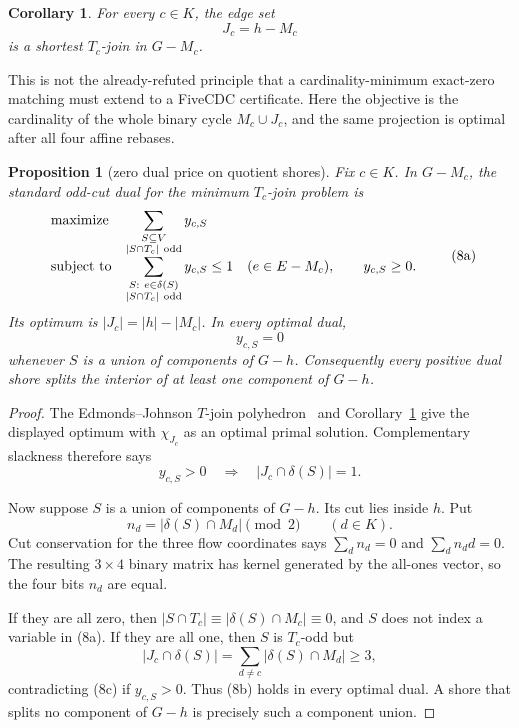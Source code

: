 \documentclass[11pt]{article}
\newtheorem{proposition}[theorem]{Proposition}
\newtheorem{corollary}[theorem]{Corollary}
\theoremstyle{definition}
\theoremstyle{remark}
\begin{document}
\begin{corollary}\label{cor:tjoin}
For every \(c\in K\), the edge set
\[
                              J_c=h-M_c
\]
is a shortest \(T_c\)-join in \(G-M_c\).
\end{corollary}

This is not the already-refuted principle that a cardinality-minimum
exact-zero matching must extend to a FiveCDC certificate.  Here the
objective is the cardinality of the whole binary cycle
\(M_c\cup J_c\), and the same projection is optimal after all four affine
rebases.

\begin{proposition}[zero dual price on quotient shores]
\label{prop:zerodualprice}
Fix \(c\in K\).  In \(G-M_c\), the standard odd-cut dual for the minimum
\(T_c\)-join problem is
\[
\begin{array}{ll}
\text{maximize}&\displaystyle
 \sum_{\substack{S\subseteq V\\|S\cap T_c|\ {\rm odd}}}y_{c,S}\\[1mm]
\text{subject to}&\displaystyle
 \sum_{\substack{S:\ e\in\delta(S)\\|S\cap T_c|\ {\rm odd}}}
 y_{c,S}\le1\quad(e\in E-M_c),\qquad y_{c,S}\ge0.
\end{array}                                               \tag{8a}
\]
Its optimum is \(|J_c|=|h|-|M_c|\).  In every optimal dual,
\[
 y_{c,S}=0                                                \tag{8b}
\]
whenever \(S\) is a union of components of \(G-h\).  Consequently every
positive dual shore splits the interior of at least one component of
\(G-h\).
\end{proposition}

\begin{proof}
The Edmonds--Johnson \(T\)-join polyhedron~\cite{EdmondsJohnson1973} and
Corollary~\ref{cor:tjoin} give the displayed optimum with
\(\chi_{J_c}\) as an optimal primal solution.  Complementary slackness
therefore says
\[
 y_{c,S}>0\quad\Longrightarrow\quad
                         |J_c\cap\delta(S)|=1.            \tag{8c}
\]

Now suppose \(S\) is a union of components of \(G-h\).  Its cut lies
inside \(h\).  Put
\[
                    n_d=|\delta(S)\cap M_d|\pmod2
                    \qquad(d\in K).
\]
Cut conservation for the three flow coordinates says
\(\sum_dn_d=0\) and \(\sum_dn_dd=0\).  The resulting \(3\times4\)
binary matrix has kernel generated by the all-ones vector, so the four
bits \(n_d\) are equal.

If they are all zero, then
\(|S\cap T_c|\equiv|\delta(S)\cap M_c|\equiv0\), and \(S\) does not
index a variable in (8a).  If they are all one, then \(S\) is
\(T_c\)-odd but
\[
 |J_c\cap\delta(S)|
 =\sum_{d\ne c}|\delta(S)\cap M_d|\ge3,                  \tag{8d}
\]
contradicting (8c) if \(y_{c,S}>0\).  Thus (8b) holds in every optimal
dual.  A shore that splits no component of \(G-h\) is precisely such a
component union.
\end{proof}
\end{document}
